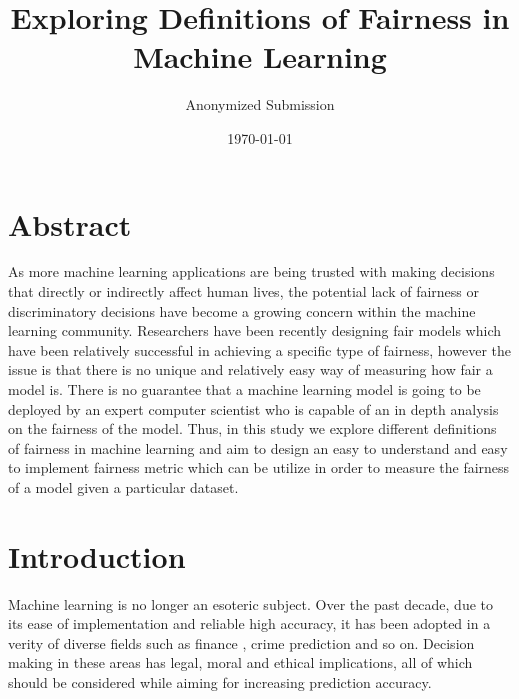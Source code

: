 \documentclass[11pt]{article}
\begin{document}
\title{Exploring Definitions of Fairness in Machine Learning}
\author{Anonymized Submission}
\date{\today}
\maketitle

\section{Abstract}
As more machine learning applications are being trusted with making decisions that directly or indirectly affect human lives, the potential lack of fairness or discriminatory decisions have become a growing concern within the machine learning community. Researchers have been recently designing fair models which have been relatively successful in achieving a specific type of fairness, however the issue is that there is no unique and relatively easy way of measuring how fair a model is. There is no guarantee that a machine learning model is going to be deployed by an expert computer scientist who is capable of an in depth analysis on the fairness of the model. Thus, in this study we explore different definitions of fairness in machine learning and aim to design an easy to understand and easy to implement fairness metric which can be utilize in order to measure the fairness of a model given a particular dataset.

\section{Introduction} \label{sec:intro}
Machine learning is no longer an esoteric subject. Over the past decade, due to its ease of implementation and reliable high accuracy, it has been adopted in a verity of diverse fields such as finance  \cite{huang2007credit, tsai2008using, galindo2000credit}, crime prediction \cite{brennan2009evaluating} and so on. Decision making in these areas has legal, moral and ethical implications, all of which should be considered while aiming for increasing prediction accuracy.
\end{document}
